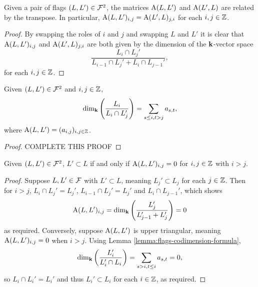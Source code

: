 \documentclass[a4paper, 11pt]{report}
\begin{document}
\begin{lemma}
Given a pair of flags $(L,L')\in\mathcal{F}^2$, the matrices $\operatorname{A}(L,L')$ and $\operatorname{A}(L',L)$ are related by the transpose. In particular, $\operatorname{A}(L,L')_{i,j} = \operatorname{A}(L',L)_{j,i}$ for each $i,j\in\mathbb{Z}$.
\end{lemma}
\begin{proof}
By swapping the roles of $i$ and $j$ and swapping $L$ and $L'$ it is clear that $\operatorname{A}(L,L')_{i,j}$ and $\operatorname{A}(L',L)_{j,i}$ are both given by the dimension of the $\mathbf{k}$-vector space
\begin{equation*}
\frac{L_i\cap L_j'}{L_{i-1}\cap L_j' + L_i\cap L_{j-1}'},
\end{equation*}
for each $i,j\in\mathbb{Z}$.
\end{proof}

\begin{lemma}\label{lemma:flags-codimension-formula}
Given $(L,L')\in\mathcal{F}^2$ and $i,j\in\mathbb{Z}$,
\begin{equation*}
\dim_{\mathbf{k}}\left(\frac{L_i}{L_i\cap L_j'}\right) = \sum_{s\le i, t>j} a_{s,t},
\end{equation*}
where $\operatorname{A}(L,L')=(a_{i,j})_{i,j\in\mathbb{Z}}$.
\end{lemma}
\begin{proof}
{\color{red}COMPLETE THIS PROOF}	
\end{proof}

\begin{lemma}
Given $(L,L')\in\mathcal{F}^2$, $L'\subset L$ if and only if $\operatorname{A}(L,L')_{i,j}=0$ for $i,j\in\mathbb{Z}$ with $i>j$.
\end{lemma}
\begin{proof}
Suppose $L,L'\in\mathcal{F}$ with $L'\subset L$, meaning $L_j'\subset L_j$ for each $j\in\mathbb{Z}$. Then for $i>j$, $L_i\cap L_j' = L_j'$, $L_{i-1}\cap L_j' = L_j'$ and $L_i\cap L_{j-1}'$, which shows
\begin{equation*}
\operatorname{A}(L,L')_{i,j} = \dim_{\mathbf{k}}\left(\frac{L_j'}{L_{j-1}'+L_j'}\right) = 0
\end{equation*}
as required. Conversely, suppose $\operatorname{A}(L,L')$ is upper triangular, meaning $\operatorname{A}(L,L')_{i,j}=0$ when $i>j$. Using Lemma \ref{lemma:flags-codimension-formula},
\begin{equation*}
\dim_{\mathbf{k}}\left(\frac{L_i'}{L_i'\cap L_i}\right) = \sum_{s>i,t\le i} a_{s,t} = 0,
\end{equation*}
so $L_i\cap L_i' = L_i'$ and thus $L_i'\subset L_i$ for each $i\in\mathbb{Z}$, as required.
\end{proof}
\end{document}
